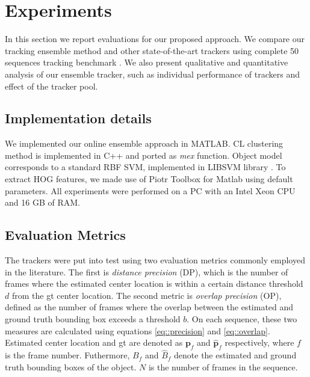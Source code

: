 \chapter{Experiments} %

\label{chapter4} %

\label{chapter::experiments}

In this section we report evaluations for our proposed approach. We compare our
tracking ensemble method and other state-of-the-art trackers using complete
50 sequences tracking benchmark \cite{Wu2013B}. We also present qualitative and
quantitative analysis of our ensemble tracker, such as
individual performance of trackers and effect of the tracker pool.

\section{Implementation details}
We implemented our online ensemble approach in MATLAB. CL clustering method is
implemented in C++ and ported as \textit{mex} function. Object model corresponds
to a standard RBF SVM, implemented in LIBSVM library \cite{libsvm}. To extract
HOG features, we made use of Piotr Toolbox for Matlab \cite{PMT} using default parameters. All experiments were performed on a PC with an Intel Xeon CPU and 16 GB of RAM.

\section{Evaluation Metrics}
The trackers were put into test using two evaluation metrics commonly employed in
the literature. The first is \textit{distance precision} (DP), which is the number
of frames where the estimated center location is within a certain distance
threshold $d$ from the \gls{gt} center location. The second metric is
\textit{overlap precision} (OP), defined as the number of frames where the
overlap between the estimated and ground truth bounding box exceeds
a threshold $b$. On each sequence, these two measures are calculated using
equations \ref{eq::precision} and \ref{eq::overlap}. Estimated center location
and \gls{gt} are denoted as $\mathbf{p}_f$ and $\mathbf{\hat{p}}_f$
respectively, where $f$ is the frame number. Futhermore, $B_f$ and $\hat{B}_f$
denote the estimated and ground truth bounding boxes of the object. $N$ is the
number of frames in the sequence.

